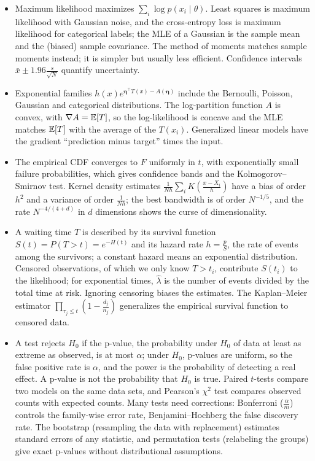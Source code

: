 \begin{itemize}[leftmargin=*]
    \item Maximum likelihood maximizes $\sum_i \log p(x_i \mid \theta)$. Least squares is maximum likelihood with Gaussian noise, and the cross-entropy loss is maximum likelihood for categorical labels; the MLE of a Gaussian is the sample mean and the (biased) sample covariance. The method of moments matches sample moments instead; it is simpler but usually less efficient. Confidence intervals $\bar x \pm 1.96\frac{s}{\sqrt{N}}$ quantify uncertainty.
    \item Exponential families $h(x)e^{\boldsymbol{\eta}^\top T(x) - A(\boldsymbol{\eta})}$ include the Bernoulli, Poisson, Gaussian and categorical distributions. The log-partition function $A$ is convex, with $\nabla A = \mathbb{E}[T]$, so the log-likelihood is concave and the MLE matches $\mathbb{E}[T]$ with the average of the $T(x_i)$. Generalized linear models have the gradient ``prediction minus target'' times the input.
    \item The empirical CDF converges to $F$ uniformly in $t$, with exponentially small failure probabilities, which gives confidence bands and the Kolmogorov--Smirnov test. Kernel density estimates $\frac{1}{Nh}\sum_i K(\frac{x - X_i}{h})$ have a bias of order $h^2$ and a variance of order $\frac{1}{Nh}$; the best bandwidth is of order $N^{-1/5}$, and the rate $N^{-4/(4+d)}$ in $d$ dimensions shows the curse of dimensionality.
    \item A waiting time $T$ is described by its survival function $S(t) = P(T > t) = e^{-H(t)}$ and its hazard rate $h = \frac{p}{S}$, the rate of events among the survivors; a constant hazard means an exponential distribution. Censored observations, of which we only know $T > t_i$, contribute $S(t_i)$ to the likelihood; for exponential times, $\hat\lambda$ is the number of events divided by the total time at risk. Ignoring censoring biases the estimates. The Kaplan--Meier estimator $\prod_{\tau_j \leq t}(1 - \frac{d_j}{n_j})$ generalizes the empirical survival function to censored data.
    \item A test rejects $H_0$ if the p-value, the probability under $H_0$ of data at least as extreme as observed, is at most $\alpha$; under $H_0$, p-values are uniform, so the false positive rate is $\alpha$, and the power is the probability of detecting a real effect. A p-value is not the probability that $H_0$ is true. Paired $t$-tests compare two models on the same data sets, and Pearson's $\chi^2$ test compares observed counts with expected counts. Many tests need corrections: Bonferroni ($\frac{\alpha}{m}$) controls the family-wise error rate, Benjamini--Hochberg the false discovery rate. The bootstrap (resampling the data with replacement) estimates standard errors of any statistic, and permutation tests (relabeling the groups) give exact p-values without distributional assumptions.

\end{itemize}
